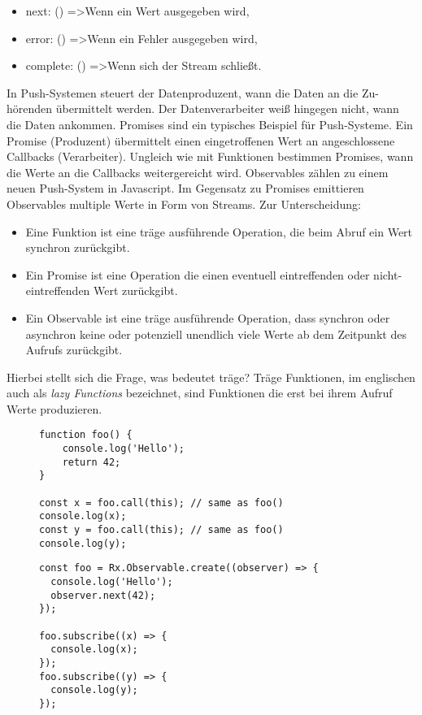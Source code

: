 \begin{itemize}
\item next: () =\textgreater Wenn ein Wert ausgegeben wird,
\item error: () =\textgreater Wenn ein Fehler ausgegeben wird,
\item complete: () =\textgreater Wenn sich der Stream schließt.
\end{itemize}

\noindent
In Push-Systemen steuert der Datenproduzent, wann die Daten an die Zu-hörenden übermittelt werden. Der Datenverarbeiter weiß hingegen nicht, wann die Daten ankommen. Promises sind ein typisches Beispiel für Push-Systeme. Ein Promise (Produzent) übermittelt einen eingetroffenen Wert an angeschlossene Callbacks (Verarbeiter). Ungleich wie mit Funktionen bestimmen Promises, wann die Werte an die Callbacks weitergereicht wird. Observables zählen zu einem neuen Push-System in Javascript. Im Gegensatz zu Promises emittieren Observables multiple Werte in Form von Streams. Zur Unterscheidung:

\begin{itemize}
\item Eine Funktion ist eine träge ausführende Operation, die beim Abruf ein Wert synchron zurückgibt.
\item Ein Promise ist eine Operation die einen eventuell eintreffenden oder nicht-eintreffenden Wert zurückgibt.
\item Ein Observable ist eine träge ausführende Operation, dass synchron oder asynchron keine oder potenziell unendlich viele Werte ab dem Zeitpunkt des Aufrufs zurückgibt.
\end{itemize}

\noindent
Hierbei stellt sich die Frage, was bedeutet träge? Träge Funktionen, im englischen auch als \textit{lazy Functions} bezeichnet, sind Funktionen die erst bei ihrem Aufruf Werte produzieren.\cite{lazy-functions}

\begin{figure}[H]
\begin{lstlisting}[basicstyle=\small]
function foo() {
    console.log('Hello');
    return 42;
}

const x = foo.call(this); // same as foo()
console.log(x);
const y = foo.call(this); // same as foo()
console.log(y);
\end{lstlisting}
\end{figure}

\begin{figure}[H]
\begin{lstlisting}[basicstyle=\small]
const foo = Rx.Observable.create((observer) => {
  console.log('Hello');
  observer.next(42);
});

foo.subscribe((x) => {
  console.log(x);
});
foo.subscribe((y) => {
  console.log(y);
});
\end{lstlisting}
\end{figure}

